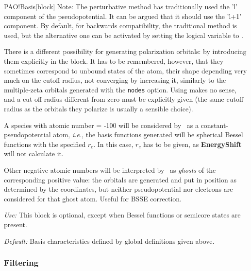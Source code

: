 \begin{fdfentry}{PAO!Basis}[block]
Note: The perturbative method has traditionally used the 'l' component
of the pseudopotential. It can be argued that it should use the 'l+1'
component. By default, for backwards compatibility, the traditional
method is used, but the alternative one can be activated by setting
the logical  variable to \fdffalse.

There is a different possibility for generating polarization orbitals:
by introducing them explicitly in the  block.
It has to be remembered, however, that they sometimes correspond to
unbound states of the atom, their shape depending very much on the
cutoff radius, not converging by increasing it, similarly to the
multiple-zeta orbitals generated with the \texttt{nodes} option.
Using  makes no sense, and a cut off
radius different from zero must be explicitly given (the same cutoff radius
as the orbitals they polarize is usually a sensible choice).

A species with atomic number = -100 will be considered by \siesta\ as
a constant-pseudopotential atom, \textit{i.e.}, the basis functions
generated will be spherical Bessel functions
with the specified $r_c$. In this case, $r_c$ has to be given, as
\textbf{EnergyShift} will not calculate it.

Other negative atomic numbers will be interpreted by \siesta\ as
\textit{ghosts}
of the corresponding positive value: the orbitals
are generated and put in position as determined by the coordinates,
but neither pseudopotential nor electrons are considered for that
ghost atom. Useful for BSSE correction.

\textit{Use:} This block is optional, except when Bessel functions or
semicore states are present.

\textit{Default:} Basis characteristics defined by global definitions given
above.

\end{fdfentry}

\subsubsection{Filtering}
\label{sec:filtering}

